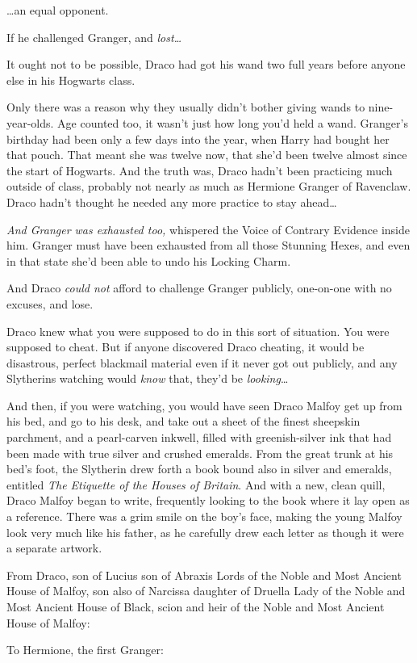 {\ldots}an equal opponent.

If he challenged Granger, and \emph{lost{\ldots}}

It ought not to be possible, Draco had got his wand two full years before anyone else in his Hogwarts class.

Only there was a reason why they usually didn't bother giving wands to nine-year-olds. Age counted too, it wasn't just how long you'd held a wand. Granger's birthday had been only a few days into the year, when Harry had bought her that pouch. That meant she was twelve now, that she'd been twelve almost since the start of Hogwarts. And the truth was, Draco hadn't been practicing much outside of class, probably not nearly as much as Hermione Granger of Ravenclaw. Draco hadn't thought he needed any more practice to stay ahead{\ldots}

\emph{And Granger was exhausted too,} whispered the Voice of Contrary Evidence inside him. Granger must have been exhausted from all those Stunning Hexes, and even in that state she'd been able to undo his Locking Charm.

And Draco \emph{could not} afford to challenge Granger publicly, one-on-one with no excuses, and lose.

Draco knew what you were supposed to do in this sort of situation. You were supposed to cheat. But if anyone discovered Draco cheating, it would be disastrous, perfect blackmail material even if it never got out publicly, and any Slytherins watching would \emph{know} that, they'd be \emph{looking}{\ldots}

And then, if you were watching, you would have seen Draco Malfoy get up from his bed, and go to his desk, and take out a sheet of the finest sheepskin parchment, and a pearl-carven inkwell, filled with greenish-silver ink that had been made with true silver and crushed emeralds. From the great trunk at his bed's foot, the Slytherin drew forth a book bound also in silver and emeralds, entitled \emph{The Etiquette of the Houses of Britain}. And with a new, clean quill, Draco Malfoy began to write, frequently looking to the book where it lay open as a reference. There was a grim smile on the boy's face, making the young Malfoy look very much like his father, as he carefully drew each letter as though it were a separate artwork.

\begin{writtenNote}
From Draco, son of Lucius son of Abraxis Lords of the Noble and Most Ancient House of Malfoy, son also of Narcissa daughter of Druella Lady of the Noble and Most Ancient House of Black, scion and heir of the Noble and Most Ancient House of Malfoy:

To Hermione, the first Granger:
\end{writtenNote}

